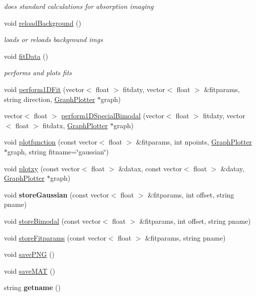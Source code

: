 \begin{DoxyCompactItemize}
\begin{DoxyCompactList}\small\item\em does standard calculations for absorption imaging \item\end{DoxyCompactList}\item 
void \hyperlink{class_atomimg_a7c6c59f8e4aea448a26746dcd9723f39}{reloadBackground} ()
\begin{DoxyCompactList}\small\item\em loads or reloads background imgs \item\end{DoxyCompactList}\item 
void \hyperlink{class_atomimg_a19ac0d2137b5a19afbb929bf3ab4ab00}{fitData} ()
\begin{DoxyCompactList}\small\item\em performs and plots fits \item\end{DoxyCompactList}\item 
void \hyperlink{class_atomimg_a831ebf5f36119254e7d65af6d96423b8}{perform1DFit} (vector$<$ float $>$ fitdaty, vector$<$ float $>$ \&fitparams, string direction, \hyperlink{class_graph_plotter}{GraphPlotter} $\ast$graph)
\item 
vector$<$ float $>$ \hyperlink{class_atomimg_a62f7f66d1b1a4740563a121af77bd34e}{perform1DSpecialBimodal} (vector$<$ float $>$ fitdaty, vector$<$ float $>$ fitdatx, \hyperlink{class_graph_plotter}{GraphPlotter} $\ast$graph)
\item 
void \hyperlink{class_atomimg_afc21bc4ccabc868deb3efbda0166954c}{plotfunction} (const vector$<$ float $>$ \&fitparams, int npoints, \hyperlink{class_graph_plotter}{GraphPlotter} $\ast$graph, string fitname=\char`\"{}gaussian\char`\"{})
\item 
void \hyperlink{class_atomimg_ae0b53227a035bc2e65ee87a62256b76e}{plotxy} (const vector$<$ float $>$ \&datax, const vector$<$ float $>$ \&datay, \hyperlink{class_graph_plotter}{GraphPlotter} $\ast$graph)
\item 
\hypertarget{class_atomimg_a0c6550434ad9ec62620771694395b836}{
void {\bfseries storeGaussian} (const vector$<$ float $>$ \&fitparams, int offset, string pname)}
\label{class_atomimg_a0c6550434ad9ec62620771694395b836}

\item 
void \hyperlink{class_atomimg_a970615bbf8cad4885818dbb993d7c257}{storeBimodal} (const vector$<$ float $>$ \&fitparams, int offset, string pname)
\item 
void \hyperlink{class_atomimg_a022dbe5f7252f8b73db8c2f03f306344}{storeFitparams} (const vector$<$ float $>$ \&fitparams, string pname)
\item 
void \hyperlink{class_atomimg_a0bc0a2970fc807403c4240f204751c2c}{savePNG} ()
\item 
void \hyperlink{class_atomimg_aab4cb735345a43bd80b5b798490a3282}{saveMAT} ()
\item 
\hypertarget{class_atomimg_aaf0166eb492d85bb85d1b035122aa2fc}{
string {\bfseries getname} ()}
\label{class_atomimg_aaf0166eb492d85bb85d1b035122aa2fc}


\end{DoxyCompactItemize}
